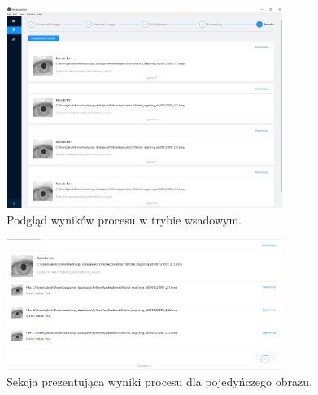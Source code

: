 \documentclass[10pt,polish,a4paper,oneside]{ppfcmthesis}
\begin{document}
\begin{figure}[ht]
  \centering
  \includegraphics[width=0.8\textwidth]{images/app/batchResults.png}
  \caption{Podgląd wyników procesu w trybie wsadowym.}
  \label{fig:batchResults}
\end{figure}

\begin{figure}[ht]
  \centering
  \includegraphics[width=0.8\textwidth]{images/app/batchSingleResult.png}
  \caption{Sekcja prezentująca wyniki procesu dla pojedyńczego obrazu.}
  \label{fig:batchSingleEntryResult}
\end{figure}
 
\end{document}
